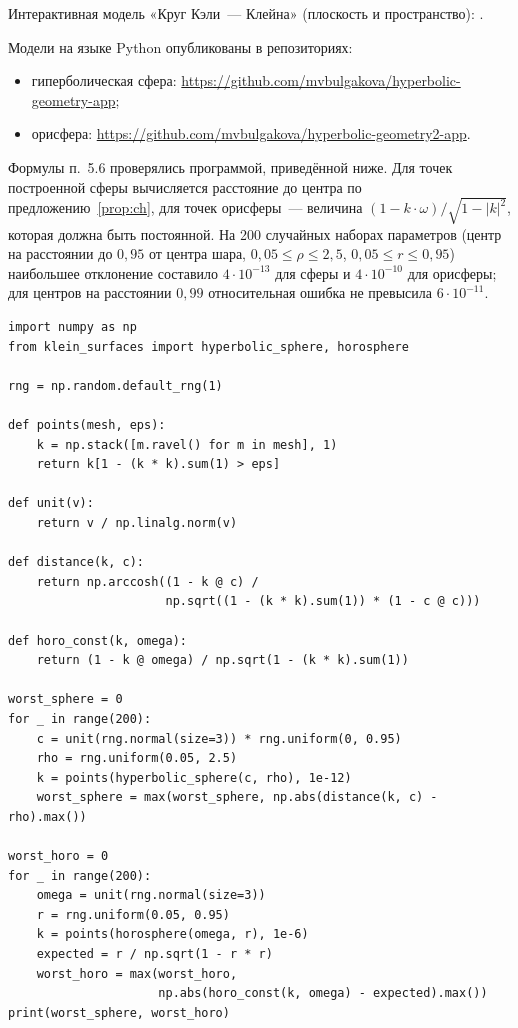 Интерактивная модель «Круг Кэли~--- Клейна» (плоскость и пространство): .

Модели на языке Python опубликованы в репозиториях:
\begin{itemize}
  \item гиперболическая сфера: \url{https://github.com/mvbulgakova/hyperbolic-geometry-app};
  \item орисфера: \url{https://github.com/mvbulgakova/hyperbolic-geometry2-app}.
\end{itemize}

Формулы п.~5.6 проверялись программой, приведённой ниже. Для точек построенной сферы вычисляется расстояние до центра по предложению~\ref{prop:ch}, для точек орисферы~--- величина $(1-k\cdot\omega)/\sqrt{1-|k|^2}$, которая должна быть постоянной. На 200 случайных наборах параметров (центр на расстоянии до $0{,}95$ от центра шара, $0{,}05\le\rho\le2{,}5$, $0{,}05\le r\le0{,}95$) наибольшее отклонение составило $4\cdot10^{-13}$ для сферы и $4\cdot10^{-10}$ для орисферы; для центров на расстоянии $0{,}99$ относительная ошибка не превысила $6\cdot10^{-11}$.

{\singlespacing\small
\begin{Verbatim}
import numpy as np
from klein_surfaces import hyperbolic_sphere, horosphere

rng = np.random.default_rng(1)

def points(mesh, eps):
    k = np.stack([m.ravel() for m in mesh], 1)
    return k[1 - (k * k).sum(1) > eps]

def unit(v):
    return v / np.linalg.norm(v)

def distance(k, c):
    return np.arccosh((1 - k @ c) /
                      np.sqrt((1 - (k * k).sum(1)) * (1 - c @ c)))

def horo_const(k, omega):
    return (1 - k @ omega) / np.sqrt(1 - (k * k).sum(1))

worst_sphere = 0
for _ in range(200):
    c = unit(rng.normal(size=3)) * rng.uniform(0, 0.95)
    rho = rng.uniform(0.05, 2.5)
    k = points(hyperbolic_sphere(c, rho), 1e-12)
    worst_sphere = max(worst_sphere, np.abs(distance(k, c) - rho).max())

worst_horo = 0
for _ in range(200):
    omega = unit(rng.normal(size=3))
    r = rng.uniform(0.05, 0.95)
    k = points(horosphere(omega, r), 1e-6)
    expected = r / np.sqrt(1 - r * r)
    worst_horo = max(worst_horo,
                     np.abs(horo_const(k, omega) - expected).max())
print(worst_sphere, worst_horo)
\end{Verbatim}
}
